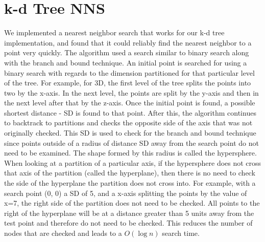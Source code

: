 \documentclass[a4paper,12pt,twocolumn]{article}
\begin{document}
\section{k-d Tree NNS}
We implemented a nearest neighbor search that works for our k-d tree implementation,
and found that it could reliably find the nearest neighbor to a point very quickly.
The algorithm used a search similar to binary search along with the branch and bound
technique. An initial point is searched for using a binary search with regards to the
dimension partitioned for that particular level of the tree. For example, for 3D,
the first level of the tree splits the points into two by the x-axis. In the next level,
the points are split by the y-axis and then in the next level after that by the z-axis.
Once the initial point is found, a possible shortest distance - SD is found to that point.
After this, the algorithm continues to backtrack to partitions and checks the opposite
side of the axis that was not originally checked. This SD is used to check for the branch
and bound technique since points outside of a radius of distance SD away from the search
point do not need to be examined. The shape formed by this radius is called the hypersphere.
When looking at a partition of a particular axis, if the hypersphere does not cross that
axis of the partition (called the hyperplane), then there is no need to check the side of
the hyperplane the partition does not cross into. For example, with a search point (0, 0) a
SD of 5, and a x-axis splitting the points by the value of x=7, the right side of the partition
does not need to be checked. All points to the right of the hyperplane will be at a distance
greater than 5 units away from the test point and therefore do not need to be checked.
This reduces the number of nodes that are checked and leads to a $O(\log n)$ search time.
\end{document}
